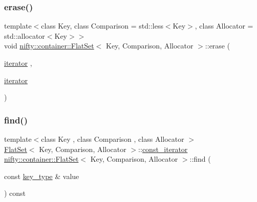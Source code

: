 \mbox{\label{classnifty_1_1container_1_1FlatSet_ac4e7ad9474d0247ae5c0369ea4cf1a07}} 
\subsubsection{\texorpdfstring{erase()}{erase()}\hspace{0.1cm}{\footnotesize\ttfamily [3/3]}}
{\footnotesize\ttfamily template$<$class Key, class Comparison = std\+::less$<$\+Key$>$, class Allocator = std\+::allocator$<$\+Key$>$$>$ \\
void \hyperlink{classnifty_1_1container_1_1FlatSet}{nifty\+::container\+::\+Flat\+Set}$<$ Key, Comparison, Allocator $>$\+::erase (\begin{DoxyParamCaption}\item[{\hyperlink{classnifty_1_1container_1_1FlatSet_a9c7fd20cd6b1878ccb8a7e068072c795}{iterator}}]{,  }\item[{\hyperlink{classnifty_1_1container_1_1FlatSet_a9c7fd20cd6b1878ccb8a7e068072c795}{iterator}}]{ }\end{DoxyParamCaption})}

\mbox{\label{classnifty_1_1container_1_1FlatSet_ad12a5bbeb3a6a3c29ab173fb0f9572c9}} 
\subsubsection{\texorpdfstring{find()}{find()}\hspace{0.1cm}{\footnotesize\ttfamily [1/2]}}
{\footnotesize\ttfamily template$<$class Key , class Comparison , class Allocator $>$ \\
\hyperlink{classnifty_1_1container_1_1FlatSet}{Flat\+Set}$<$ Key, Comparison, Allocator $>$\+::\hyperlink{classnifty_1_1container_1_1FlatSet_a0f4cd26da060859b18742abfd534aa24}{const\+\_\+iterator} \hyperlink{classnifty_1_1container_1_1FlatSet}{nifty\+::container\+::\+Flat\+Set}$<$ Key, Comparison, Allocator $>$\+::find (\begin{DoxyParamCaption}\item[{const \hyperlink{classnifty_1_1container_1_1FlatSet_a0101a4574052389646be8d9bf092a949}{key\+\_\+type} \&}]{value }\end{DoxyParamCaption}) const\hspace{0.3cm}{\ttfamily [inline]}}

